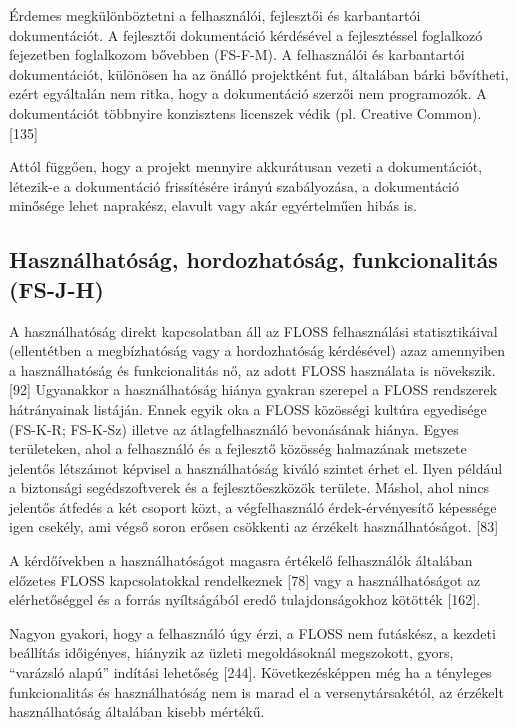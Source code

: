 \documentclass[12pt,magyar,a4paper,oneside]{scrreprt}
\begin{document}
Érdemes megkülönböztetni a felhasználói, fejlesztői és karbantartói
dokumentációt. A fejlesztői dokumentáció kérdésével a fejlesztéssel
foglalkozó fejezetben foglalkozom bővebben (FS-F-M). A felhasználói és
karbantartói dokumentációt, különösen ha az önálló projektként fut,
általában bárki bővítheti, ezért egyáltalán nem ritka, hogy a
dokumentáció szerzői nem programozók. A dokumentációt többnyire
konzisztens licenszek védik (pl. Creative Common). {[}135{]}

Attól függően, hogy a projekt mennyire akkurátusan vezeti a
dokumentációt, létezik-e a dokumentáció frissítésére irányú
szabályozása, a dokumentáció minősége lehet naprakész, elavult vagy akár
egyértelműen hibás is.

\hypertarget{sec:FS-J-H}{%
\subsection{Használhatóság, hordozhatóság, funkcionalitás
(FS-J-H)}\label{sec:FS-J-H}}

A használhatóság direkt kapcsolatban áll az FLOSS felhasználási
statisztikáival (ellentétben a megbízhatóság vagy a hordozhatóság
kérdésével) azaz amennyiben a használhatóság és funkcionalitás nő, az
adott FLOSS használata is növekszik. {[}92{]} Ugyanakkor a
használhatóság hiánya gyakran szerepel a FLOSS rendszerek hátrányainak
listáján. Ennek egyik oka a FLOSS közösségi kultúra egyedisége (FS-K-R;
FS-K-Sz) illetve az átlagfelhasználó bevonásának hiánya. Egyes
területeken, ahol a felhasználó és a fejlesztő közösség halmazának
metszete jelentős létszámot képvisel a használhatóság kiváló szintet
érhet el. Ilyen például a biztonsági segédszoftverek és a
fejlesztőeszközök területe. Máshol, ahol nincs jelentős átfedés a két
csoport közt, a végfelhasználó érdek-érvényesítő képessége igen csekély,
ami végső soron erősen csökkenti az érzékelt használhatóságot. {[}83{]}

A kérdőívekben a használhatóságot magasra értékelő felhasználók
általában előzetes FLOSS kapcsolatokkal rendelkeznek {[}78{]} vagy a
használhatóságot az elérhetőséggel és a forrás nyíltságából eredő
tulajdonságokhoz kötötték {[}162{]}.

Nagyon gyakori, hogy a felhasználó úgy érzi, a FLOSS nem futáskész, a
kezdeti beállítás időigényes, hiányzik az üzleti megoldásoknál
megszokott, gyors, ``varázsló alapú'' indítási lehetőség {[}244{]}.
Következésképpen még ha a tényleges funkcionalitás és használhatóság nem
is marad el a versenytársakétól, az érzékelt használhatóság általában
kisebb mértékű.
\end{document}
